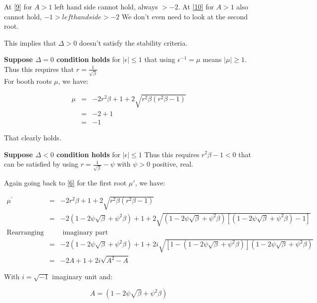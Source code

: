 \documentclass[legalpaper, 12pt]{article}
\begin{document}
At \ref{9} for $ A > 1 $ left hand side cannot hold, always $ > -2 $. 
At \ref{10} for $ A > 1 $ also cannot hold, $ -1 > left hand side > -2 $
We don't even need to look at the second root. 

This implies that $ \Delta > 0 $ doesn't satisfy the stability criteria. 

\textbf{Suppose $ \Delta = 0 $ condition holds} for $ | \epsilon |  \leq 1 $ that using $ \epsilon^{-1} = \mu $ means $ |\mu| \geq 1 $. Thus this requires that $ r = \frac{1}{ \sqrt{ \beta} } $ \\

For booth roots $ \mu $, we have:

\begin{eqnarray}
\mu &=& -2r^2\beta+1 + 2\sqrt{r^2\beta(r^2\beta-1)} \nonumber \\
	&=& -2+1 \\ 
	&=& -1 \label{11}
\end{eqnarray}

That clearly holds. 

\textbf{Suppose $ \Delta < 0 $ condition holds} for $ | \epsilon |  \leq 1 $  Thus this requires $ r^2 \beta - 1 < 0 $  that can be satisfied by using $ r = \frac{1}{ \sqrt{ \beta} } - \psi $ with $ \psi > 0 $ positive, real. 

Again going back to \ref{6} for the first root $ \mu{'} $, we have:

\begin{eqnarray}
\mu^{'} &=& -2r^2\beta+1 + 2\sqrt{r^2\beta(r^2\beta-1)} \nonumber \\
	&=& -2 	\left(1-2\psi\sqrt{\beta}+\psi^2\beta\right) +1 + 2 \sqrt{\left(1-2\psi\sqrt{\beta}+\psi^2\beta\right)\left[\left(1-2\psi\sqrt{\beta}+\psi^2\beta\right)-1\right]} \nonumber \\
\text{Rearranging due} && \text{ imaginary part} \nonumber \\
	&=& -2 	\left(1-2\psi\sqrt{\beta}+\psi^2\beta\right) +1 + 2 i\sqrt{\left[1-\left(1-2\psi\sqrt{\beta}+\psi^2\beta\right)\right]\left(1-2\psi\sqrt{\beta}+\psi^2\beta\right)} \nonumber \\
	&=& -2 A + 1 + 2i\sqrt{A^2-A} \label{12}
\end{eqnarray}

With $i=\sqrt{-1}$ imaginary unit and:

\begin{equation}
A = \left(1-2\psi\sqrt{\beta}+\psi^2\beta\right) \label{13}
\end{equation}
\end{document}
